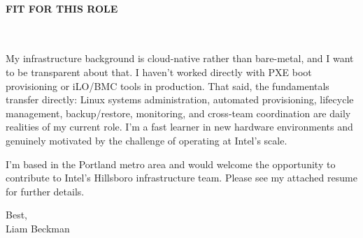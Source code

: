 \paragraph{FIT FOR THIS ROLE}\

\vspace*{\baselineskip}

My infrastructure background is cloud-native rather than bare-metal, and I want to be transparent about that. I haven't worked directly with PXE boot provisioning or iLO/BMC tools in production. That said, the fundamentals transfer directly: Linux systems administration, automated provisioning, lifecycle management, backup/restore, monitoring, and cross-team coordination are daily realities of my current role. I'm a fast learner in new hardware environments and genuinely motivated by the challenge of operating at Intel's scale.

\vspace*{\baselineskip}

I'm based in the Portland metro area and would welcome the opportunity to contribute to Intel's Hillsboro infrastructure team. Please see my attached resume for further details.

\vspace*{\baselineskip}

Best,\\

Liam Beckman

\vfill \myBreak{}



